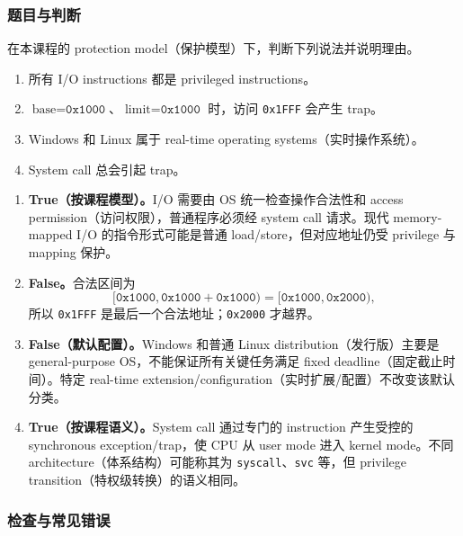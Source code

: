 \subsubsection*{题目与判断}

在本课程的 protection model（保护模型）下，判断下列说法并说明理由。

\begin{enumerate}[label=(\alph*)]
  \item 所有 I/O instructions 都是 privileged instructions。
  \item $\text{base}=\texttt{0x1000}$、$\text{limit}=\texttt{0x1000}$ 时，访问 \texttt{0x1FFF} 会产生 trap。
  \item Windows 和 Linux 属于 real-time operating systems（实时操作系统）。
  \item System call 总会引起 trap。
\end{enumerate}

\begin{checkedsolution}
\begin{enumerate}[label=(\alph*)]
  \item \textbf{True（按课程模型）。}I/O 需要由 OS 统一检查操作合法性和 access permission（访问权限），普通程序必须经 system call 请求。现代 memory-mapped I/O 的指令形式可能是普通 load/store，但对应地址仍受 privilege 与 mapping 保护。
  \item \textbf{False。}合法区间为
    \[
      [\texttt{0x1000},\texttt{0x1000}+\texttt{0x1000})
      =[\texttt{0x1000},\texttt{0x2000}),
    \]
    所以 \texttt{0x1FFF} 是最后一个合法地址；\texttt{0x2000} 才越界。
  \item \textbf{False（默认配置）。}Windows 和普通 Linux distribution（发行版）主要是 general-purpose OS，不能保证所有关键任务满足 fixed deadline（固定截止时间）。特定 real-time extension/configuration（实时扩展/配置）不改变该默认分类。
  \item \textbf{True（按课程语义）。}System call 通过专门的 instruction 产生受控的 synchronous exception/trap，使 CPU 从 user mode 进入 kernel mode。不同 architecture（体系结构）可能称其为 \texttt{syscall}、\texttt{svc} 等，但 privilege transition（特权级转换）的语义相同。
\end{enumerate}
\end{checkedsolution}

\subsubsection*{检查与常见错误}

